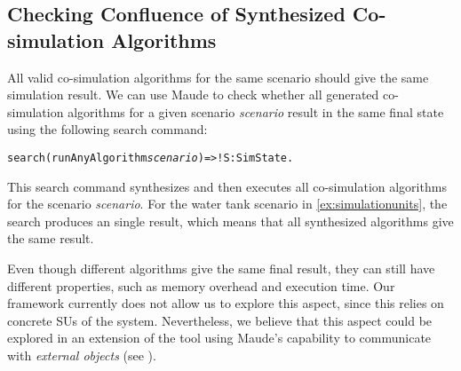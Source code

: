 \subsection{Checking Confluence of Synthesized Co-simulation Algorithms}
All valid co-simulation algorithms for the same scenario should give the same simulation result.
We can use Maude to check whether all generated co-simulation algorithms for a given scenario \emph{scenario} result in the same final state using the following search command:

\small
\begin{alltt}
  search (runAnyAlgorithm \emph{scenario})  =>! S:SimState . 
  \end{alltt}
\normalsize

This search command synthesizes and then executes all co-simulation algorithms for the scenario \emph{scenario}. 
For the water tank scenario in \cref{ex:simulationunits}, the search produces an single result, which means that all synthesized algorithms give the same result.


Even though different algorithms give the same final result, they can still have different properties, such as memory overhead and execution time. 
Our framework currently does not allow us to explore this aspect, since this relies on concrete SUs of the system.
Nevertheless, we believe that this aspect could be explored in an extension of the tool using Maude's capability to communicate with \emph{external objects} (see \cite[Sect. 9]{maudemanual}).